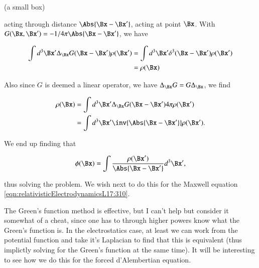 (a small box)

acting through distance $\Abs{\Bx - \Bx'}$, acting at point $\Bx$.  With $G(\Bx, \Bx') = -1/4 \pi\Abs{\Bx - \Bx'}$, we have

\begin{align*}
\int d^3 \Bx' \Delta_{\Bx} G(\Bx - \Bx') \rho(\Bx') 
&= \int d^3 \Bx' \delta^3( \Bx - \Bx') \rho(\Bx') \\
&= \rho(\Bx)
\end{align*}

Also since $G$ is deemed a linear operator, we have $\Delta_\Bx G = G \Delta_\Bx$, we find

\begin{align*}
\rho(\Bx)
&=
\int d^3 \Bx' \Delta_{\Bx} G(\Bx - \Bx') 4 \pi \rho(\Bx') \\
&=
\int d^3 \Bx' \inv{\Abs{\Bx - \Bx'}} \rho(\Bx').
\end{align*}

We end up finding that 

\begin{equation}\label{eqn:relativisticElectrodynamicsL17:390}
\phi(\Bx) = \int \frac{\rho(\Bx')}{\Abs{\Bx - \Bx'}} d^3 \Bx',
\end{equation}

thus solving the problem.  We wish next to do this for the Maxwell equation \ref{eqn:relativisticElectrodynamicsL17:310}.

The Green's function method is effective, but I can't help but consider it somewhat of a cheat, since one has to through higher powers know what the Green's function is.  In the electrostatics case, at least we can work from the potential function and take it's Laplacian to find that this is equivalent (thus implictly solving for the Green's function at the same time).  It will be interesting to see how we do this for the forced d'Alembertian equation.

\EndArticle
